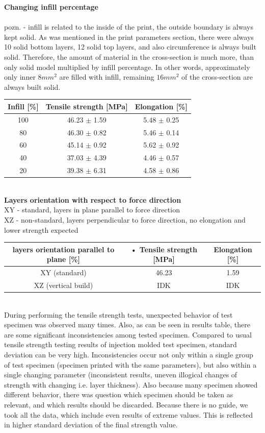 \documentclass[a4paper, twoside, 11pt]{report}
\begin{document}
%
\textbf{Changing infill percentage}\\
\\pozn. - infill is related to the inside of the print, the outside boundary is always kept solid. As was mentioned in the print parameters section, there were always 10 solid bottom layers, 12 solid top layers, and also circumference is always built solid. Therefore, the amount of material in the cross-section is much more, than only solid model multiplied by infill percentage. In other words, approximately only inner $8mm^2$ are filled with infill, remaining $16mm^2$ of the cross-section are always built solid.\\
\begin{tabular}{|c|c|c|}
\hline 
Infill [\%] & Tensile strength [MPa] & Elongation [\%]\\ 
\hline 
100 & 46.23 $\pm$ 1.59 & 5.48 $\pm$ 0.25\\ 
\hline 
80 & 46.30 $\pm$ 0.82 & 5.46 $\pm$ 0.14\\ 
\hline 
60 & 45.14 $\pm$ 0.92 & 5.62 $\pm$ 0.92\\ 
\hline 
40 & 37.03 $\pm$ 4.39 & 4.46 $\pm$ 0.57\\ 
\hline
20 & 39.38 $\pm$ 6.31 & 4.58 $\pm$ 0.86\\ 
\hline 
\end{tabular}
\\[20pt]
%
\textbf{Layers orientation with respect to force direction}\\
XY - standard, layers in plane parallel to force direction\\
XZ - non-standard, layers perpendicular to force direction, no elongation and lower strength expected
\begin{tabular}{|c|c|c|}
\hline 
layers orientation parallel to plane [\%] & • Tensile strength [MPa] & Elongation [\%]\\ 
\hline 
XY (standard) & 46.23 & 1.59\\ 
\hline 
XZ (vertical build) & IDK & IDK\\ 
\hline
\end{tabular}
\\[30pt]
During performing the tensile strength tests, unexpected behavior of test specimen was observed many times. Also, as can be seen in results table, there are some significant inconsistencies among tested specimen. Compared to usual tensile strength testing results of injection molded test specimen, standard deviation can be very high. Inconsistencies occur not only within a single group of test specimen (specimen printed with the same parameters), but also within a single changing parameter (inconsistent results, uneven illogical changes of strength with changing i.e. layer thickness). Also because many specimen showed different behavior, there was question which specimen should be taken as relevant, and which results should be discarded. Because there is no guide, we took all the data, which include even results of extreme values. This is reflected in higher standard deviation of the final strength value.
\end{document}
